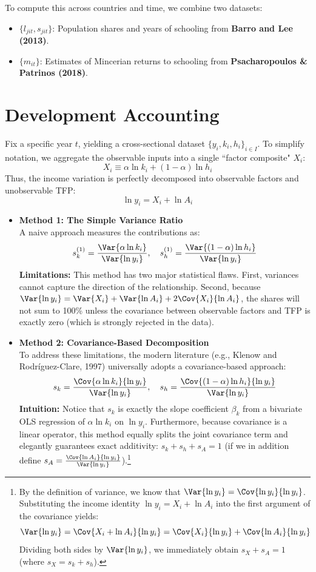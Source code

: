To compute this across countries and time, we combine two datasets:
\begin{itemize}
    \item $\{l_{jit}, s_{jit}\}$: Population shares and years of schooling from \textbf{Barro and Lee (2013)}.
    \item $\{m_{it}\}$: Estimates of Mincerian returns to schooling from \textbf{Psacharopoulos \& Patrinos (2018)}.
\end{itemize}

\section{Development Accounting}

Fix a specific year $t$, yielding a cross-sectional dataset $\{y_i, k_i, h_i\}_{i \in I}$. To simplify notation, we aggregate the observable inputs into a single ``factor composite" $X_i$:
\[
X_i \equiv \alpha \ln k_i + (1-\alpha) \ln h_i
\]
Thus, the income variation is perfectly decomposed into observable factors and unobservable TFP:
\[
\ln y_i = X_i + \ln A_i
\]

\begin{itemize}
    \item \textbf{Method 1: The Simple Variance Ratio}\\
    A naive approach measures the contributions as:
\[
s_k^{(1)} = \frac{\Var{\alpha \ln k_i}}{\Var{\ln y_i}}, \quad s_h^{(1)} = \frac{\Var{(1-\alpha) \ln h_i}}{\Var{\ln y_i}}
\]
\textbf{Limitations:} This method has two major statistical flaws. First, variances cannot capture the direction of the relationship. Second, because $\Var{\ln y_i} = \Var{X_i} + \Var{\ln A_i} + 2\Cov{X_i}{\ln A_i}$, the shares will not sum to 100\% unless the covariance between observable factors and TFP is exactly zero (which is strongly rejected in the data).
    \item \textbf{Method 2: Covariance-Based Decomposition}\\
    To address these limitations, the modern literature (e.g., Klenow and Rodríguez-Clare, 1997) universally adopts a covariance-based approach:
\[
s_k = \frac{\Cov{\alpha \ln k_i}{\ln y_i}}{\Var{\ln y_i}}, \quad s_h = \frac{\Cov{(1-\alpha) \ln h_i}{\ln y_i}}{\Var{\ln y_i}}
\]
\textbf{Intuition:} Notice that $s_k$ is exactly the slope coefficient $\beta_k$ from a bivariate OLS regression of $\alpha \ln k_i$ on $\ln y_i$. Furthermore, because covariance is a linear operator, this method equally splits the joint covariance term and elegantly guarantees exact additivity: $s_k + s_h + s_A = 1$ (if we in addition define $s_A = \frac{\Cov{\ln A_i}{\ln y_i}}{\Var{\ln y_i}}$).\footnote{
    By the definition of variance, we know that $\Var{\ln y_i} = \Cov{\ln y_i}{\ln y_i}$. Substituting the income identity $\ln y_i = X_i + \ln A_i$ into the first argument of the covariance yields:
\[
\Var{\ln y_i} = \Cov{X_i + \ln A_i}{\ln y_i} = \Cov{X_i}{\ln y_i} + \Cov{\ln A_i}{\ln y_i}
\]
Dividing both sides by $\Var{\ln y_i}$, we immediately obtain $s_X + s_A = 1$ (where $s_X = s_k + s_h$).
}
\end{itemize}

